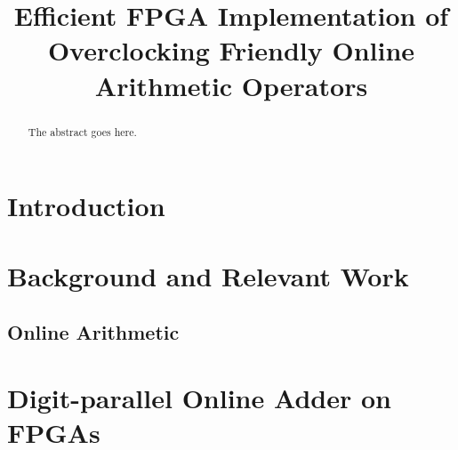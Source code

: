 \documentclass[conference]{IEEEtran}
\begin{document}
\title{Efficient FPGA Implementation of\\ Overclocking Friendly Online Arithmetic Operators}



\maketitle


\begin{abstract}
The abstract goes here.
\end{abstract}


%
\IEEEpeerreviewmaketitle



\section{Introduction}

\section{Background and Relevant Work}
\subsection{Online Arithmetic}



\section{Digit-parallel Online Adder on FPGAs}
\end{document}
